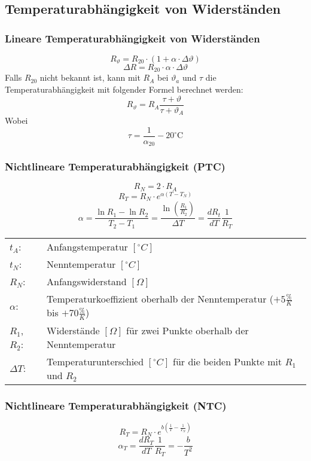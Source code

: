



\subsection{Temperaturabhängigkeit von Widerständen}

\subsubsection{Lineare Temperaturabhängigkeit von Widerständen}
\[ R_\vartheta = R_{20} \cdot (1 + \alpha \cdot \Delta \vartheta) \]
\[ \Delta R = R_{20} \cdot \alpha \cdot \Delta \vartheta \]
Falls $R_{20}$ nicht bekannt ist, kann mit $R_A$ bei $\vartheta_a$ und $\tau$ 
die Temperaturabhängigkeit mit folgender Formel berechnet werden:  
\[ R_\vartheta = R_A \frac{\tau + \vartheta}{\tau + \vartheta_A} \]
Wobei 
\[ \tau = \frac{1}{\alpha_20} - 20^{\circ}\text{C} \]

\subsubsection{Nichtlineare Temperaturabhängigkeit (PTC)}
\[ R_N = 2 \cdot R_A \]
\[ R_T = R_N \cdot e^{\alpha (T - T_N)} \]
\[ \alpha = \frac{\ln R_1 - \ln R_2}{T_2 - T_1} 
= \frac{\ln\left(\frac{R_1}{R_2}\right)}{\Delta T} 
= \frac{d R_t}{d T}\frac{1}{R_T} \]
\begin{tabular}{@{}lp{}}
  $t_A$:        & Anfangstemperatur $[^\circ C]$ \\
  $t_N$:        & Nenntemperatur $[^\circ C]$ \\
  $R_N$:        & Anfangswiderstand $[\Omega]$ \\
  $\alpha$:     & Temperaturkoeffizient oberhalb der Nenntemperatur 
                  ($+5\frac{\%}{K}$ bis $+70\frac{\%}{K}$) \\
  $R_1$, $R_2$: & Widerstände $[\Omega]$ für zwei Punkte oberhalb der 
                  Nenntemperatur \\
  $\Delta T$:   & Temperaturunterschied $[^\circ C]$ für die beiden Punkte mit 
                  $R_1$ und $R_2$
\end{tabular}

\subsubsection{Nichtlineare Temperaturabhängigkeit (NTC)}
\[ R_T = R_N \cdot e^{b\left(\frac{1}{T} - \frac{1}{T_N}\right)} \]
\[ \alpha_T = \frac{d R_T}{d T}\frac{1}{R_T} = -\frac{b}{T^2} \]